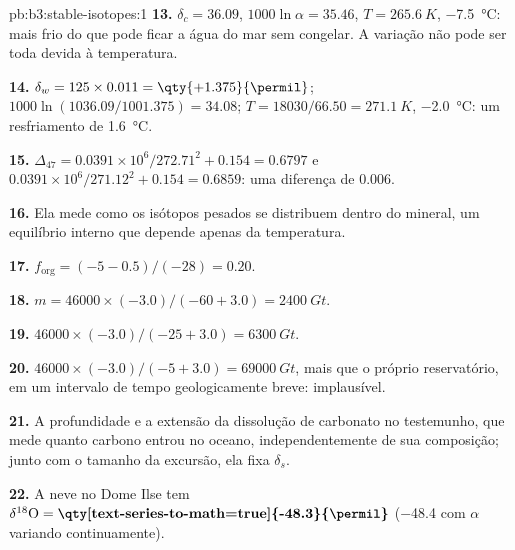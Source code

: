 \begin{solution}{pb:b3:stable-isotopes:1}
\textbf{13.} $\delta_c = 36.09$, $1000\ln\alpha = 35.46$, $T = \qty{265.6}{K}$,
\qty{-7.5}{\celsius}: mais frio do que pode ficar a água do mar sem congelar. A
variação não pode ser toda devida à temperatura.

\textbf{14.} $\delta_w = 125\times0.011 = \qty{+1.375}{\permil}$; $1000\ln(1036.09/1001.375)
= 34.08$; $T = 18030/66.50 = \qty{271.1}{K}$, \qty{-2.0}{\celsius}: um resfriamento de
\qty{1.6}{\celsius}.

\textbf{15.} $\Delta_{47} = 0.0391\times10^6/272.71^2 + 0.154 = 0.6797$ e
$0.0391\times10^6/271.12^2 + 0.154 = 0.6859$: uma diferença de
\qty{0.006}{\permil}.

\textbf{16.} Ela mede como os isótopos pesados se distribuem dentro do
mineral, um equilíbrio interno que depende apenas da temperatura.

\textbf{17.} $f_{\mathrm{org}} = (-5 - 0.5)/(-28) = 0.20$.

\textbf{18.} $m = 46000\times(-3.0)/(-60 + 3.0) = \qty{2400}{Gt}$.

\textbf{19.} $46000\times(-3.0)/(-25 + 3.0) = \qty{6300}{Gt}$.

\textbf{20.} $46000\times(-3.0)/(-5 + 3.0) = \qty{69000}{Gt}$, mais que o
próprio reservatório, em um intervalo de tempo geologicamente breve: implausível.

\textbf{21.} A profundidade e a extensão da dissolução de carbonato no testemunho, que
mede quanto carbono entrou no oceano, independentemente de sua composição;
junto com o tamanho da excursão, ela fixa $\delta_s$.

\textbf{22.} A neve no Dome Ilse tem $\delta^{18}\mathrm O =
\textbf{\qty[text-series-to-math=true]{-48.3}{\permil}} $ (\qty{-48.4}{\permil}
com $\alpha$ variando continuamente).
\end{solution}

